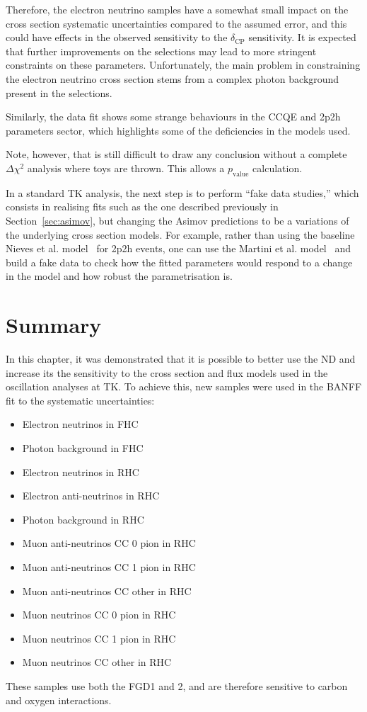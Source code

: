 Therefore, the electron neutrino samples have a somewhat small impact
on the cross section systematic uncertainties compared to the assumed
error, and this could have effects in the observed sensitivity to the
$\delta_{\text{CP}}$ sensitivity. It is expected that further
improvements on the selections may lead to more stringent constraints
on these parameters. Unfortunately, the main problem in constraining
the electron neutrino cross section stems from a complex photon
background present in the selections.

Similarly, the data fit shows some strange behaviours in the
\Gls{CCQE} and \Gls{2p2h} parameters sector, which highlights some of
the deficiencies in the models used.

Note, however, that is still difficult to draw any conclusion without a
complete $\Delta\chi^2$ analysis where toys are thrown. This
allows a $p_\text{value}$ calculation.

In a standard \Gls{TK} analysis, the next step is to perform ``fake
data studies,'' which consists in realising fits such as the one
described previously in Section~\ref{sec:asimov}, but changing the
\Gls{Asimov} predictions to be a variations of the underlying cross
section models. For example, rather than using the baseline Nieves et
al. model~\cite{NievesCCinc} for \gls{2p2h} events, one can use the
Martini et al. model~\cite{MartiniNpNh1,MartiniNpNh2} and build a fake
data to check how the fitted parameters would respond to a change in
the model and how robust the parametrisation is.

\clearpage
\section{Summary}
\label{sec:banffsumm}
In this chapter, it was demonstrated that it is possible to better use
the \Gls{ND} and increase its the sensitivity to the cross section and
flux models used in the oscillation analyses at \Gls{TK}. To achieve
this, new samples were used in the \Gls{BANFF} fit to the systematic
uncertainties:
\begin{itemize}[noitemsep,topsep=0pt]
\item Electron neutrinos in \Gls{FHC}
\item Photon background in \Gls{FHC}
\item Electron neutrinos in \Gls{RHC}
\item Electron anti-neutrinos in \Gls{RHC}
\item Photon background in \Gls{RHC}
\item Muon anti-neutrinos \Gls{CC} 0 pion in \Gls{RHC}
\item Muon anti-neutrinos \Gls{CC} 1 pion in \Gls{RHC}
\item Muon anti-neutrinos \Gls{CC} other in \Gls{RHC}
\item Muon neutrinos \Gls{CC} 0 pion in \Gls{RHC}
\item Muon neutrinos \Gls{CC} 1 pion in \Gls{RHC}
\item Muon neutrinos \Gls{CC} other in \Gls{RHC}
\end{itemize}
These samples use both the \Gls{FGD}1 and 2, and are therefore
sensitive to carbon and oxygen interactions.

